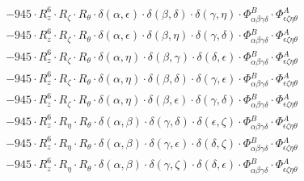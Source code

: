 \documentclass{article}
\begin{document}
\begin{equation}
\begin{array}{c}
 \\[0.2em] 		 - 945 \cdot R_{z}^{6} \cdot R_{\zeta{}} \cdot R_{\theta{}} \cdot \delta{}\left(\alpha{}, \epsilon{}\right) \cdot \delta{}\left(\beta{}, \delta{}\right) \cdot \delta{}\left(\gamma{}, \eta{}\right) \cdot \Phi{}^{B}_{\alpha{}\beta{}\gamma{}\delta{}} \cdot \Phi{}^{A}_{\epsilon{}\zeta{}\eta{}\theta{}} 
 \\[0.2em] 		 - 945 \cdot R_{z}^{6} \cdot R_{\zeta{}} \cdot R_{\theta{}} \cdot \delta{}\left(\alpha{}, \epsilon{}\right) \cdot \delta{}\left(\beta{}, \eta{}\right) \cdot \delta{}\left(\gamma{}, \delta{}\right) \cdot \Phi{}^{B}_{\alpha{}\beta{}\gamma{}\delta{}} \cdot \Phi{}^{A}_{\epsilon{}\zeta{}\eta{}\theta{}} 
 \\[0.2em] 		 - 945 \cdot R_{z}^{6} \cdot R_{\zeta{}} \cdot R_{\theta{}} \cdot \delta{}\left(\alpha{}, \eta{}\right) \cdot \delta{}\left(\beta{}, \gamma{}\right) \cdot \delta{}\left(\delta{}, \epsilon{}\right) \cdot \Phi{}^{B}_{\alpha{}\beta{}\gamma{}\delta{}} \cdot \Phi{}^{A}_{\epsilon{}\zeta{}\eta{}\theta{}} 
 \\[0.2em] 		 - 945 \cdot R_{z}^{6} \cdot R_{\zeta{}} \cdot R_{\theta{}} \cdot \delta{}\left(\alpha{}, \eta{}\right) \cdot \delta{}\left(\beta{}, \delta{}\right) \cdot \delta{}\left(\gamma{}, \epsilon{}\right) \cdot \Phi{}^{B}_{\alpha{}\beta{}\gamma{}\delta{}} \cdot \Phi{}^{A}_{\epsilon{}\zeta{}\eta{}\theta{}} 
 \\[0.2em] 		 - 945 \cdot R_{z}^{6} \cdot R_{\zeta{}} \cdot R_{\theta{}} \cdot \delta{}\left(\alpha{}, \eta{}\right) \cdot \delta{}\left(\beta{}, \epsilon{}\right) \cdot \delta{}\left(\gamma{}, \delta{}\right) \cdot \Phi{}^{B}_{\alpha{}\beta{}\gamma{}\delta{}} \cdot \Phi{}^{A}_{\epsilon{}\zeta{}\eta{}\theta{}} 
 \\[0.2em] 		 - 945 \cdot R_{z}^{6} \cdot R_{\eta{}} \cdot R_{\theta{}} \cdot \delta{}\left(\alpha{}, \beta{}\right) \cdot \delta{}\left(\gamma{}, \delta{}\right) \cdot \delta{}\left(\epsilon{}, \zeta{}\right) \cdot \Phi{}^{B}_{\alpha{}\beta{}\gamma{}\delta{}} \cdot \Phi{}^{A}_{\epsilon{}\zeta{}\eta{}\theta{}} 
 \\[0.2em] 		 - 945 \cdot R_{z}^{6} \cdot R_{\eta{}} \cdot R_{\theta{}} \cdot \delta{}\left(\alpha{}, \beta{}\right) \cdot \delta{}\left(\gamma{}, \epsilon{}\right) \cdot \delta{}\left(\delta{}, \zeta{}\right) \cdot \Phi{}^{B}_{\alpha{}\beta{}\gamma{}\delta{}} \cdot \Phi{}^{A}_{\epsilon{}\zeta{}\eta{}\theta{}} 
 \\[0.2em] 		 - 945 \cdot R_{z}^{6} \cdot R_{\eta{}} \cdot R_{\theta{}} \cdot \delta{}\left(\alpha{}, \beta{}\right) \cdot \delta{}\left(\gamma{}, \zeta{}\right) \cdot \delta{}\left(\delta{}, \epsilon{}\right) \cdot \Phi{}^{B}_{\alpha{}\beta{}\gamma{}\delta{}} \cdot \Phi{}^{A}_{\epsilon{}\zeta{}\eta{}\theta{}} 

\end{array}
\end{equation}
\end{document}
